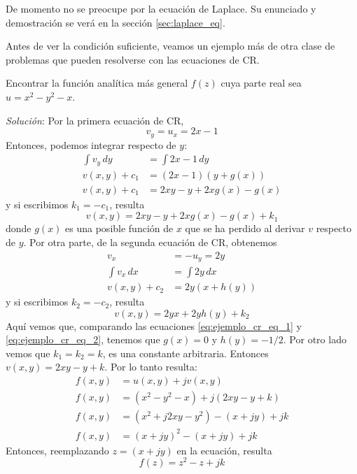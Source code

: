 De momento no se preocupe por la ecuación de Laplace. Su enunciado y demostración se verá en la sección \ref{sec:laplace_eq}.

Antes de ver la condición suficiente, veamos un ejemplo más de otra clase de problemas que pueden resolverse con las ecuaciones de CR.
\begin{example}
  Encontrar la función analítica más general $f(z)$ cuya parte real sea $u=x^2-y^2-x$.

  \textit{Solución}: Por la primera ecuación de CR,
  \[
    v_y = u_x = 2x-1
  \]
  Entonces, podemos integrar respecto de $y$:
  \begin{align*}
    \int v_y \, dy &= \int 2x -1 \, dy \\ 
    v(x,y) + c_1 &= (2x-1)(y+g(x)) \\ 
    v(x,y) + c_1 &= 2xy - y + 2xg(x) - g(x) 
  \end{align*}
  y si escribimos $k_1=-c_1$, resulta
  \begin{equation}\label{eq:ejemplo_cr_eq_1}
    v(x,y) = 2xy - y + 2xg(x) - g(x) + k_1
  \end{equation}
  donde $g(x)$ es una posible función de $x$ que se ha perdido al derivar $v$ respecto de $y$. Por otra parte, de la segunda ecuación de CR, obtenemos
  \begin{align*}
    v_x &= -u_y = 2y \\ 
    \int v_x \,dx &= \int 2y \, dx \\ 
    v(x,y) + c_2 &= 2y (x + h(y)) 
  \end{align*}
  y si escribimos $k_2=-c_2$, resulta
  \begin{equation}\label{eq:ejemplo_cr_eq_2}
    v(x,y) = 2yx + 2yh(y) + k_2
  \end{equation}
  Aquí vemos que, comparando las ecuaciones \ref{eq:ejemplo_cr_eq_1} y \ref{eq:ejemplo_cr_eq_2}, tenemos que $g(x)=0$ y $h(y)=-1/2$. Por otro lado vemos que $k_1 = k_2 = k$, es una constante arbitraria. Entonces $v(x,y)=2xy - y + k$. Por lo tanto resulta:
  \begin{align*}
    f(x,y) &= u(x,y) + jv(x,y) \\ 
    f(x,y) &= (x^2-y^2-x) + j(2xy - y + k) \\ 
    f(x,y) &= (x^2 + j2xy - y^2) - (x+jy) + jk \\ 
    f(x,y) &= (x+jy)^2 - (x+jy) + jk
  \end{align*}
  Entonces, reemplazando $z=(x+jy)$ en la ecuación, resulta
  \[
    \boxed{f(z) = z^2 - z + jk}
  \]
\end{example}

